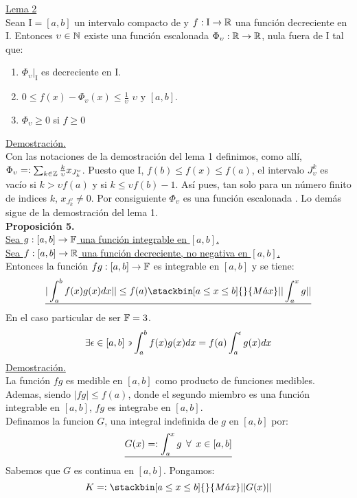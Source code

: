 \underline{Lema 2}\\
Sean $\mathrm{I}=[a,b]$ un intervalo compacto de \R \phantom{} y $f: \mathrm{I} \rightarrow \mathbb{R}$ una función decreciente en $\mathrm{I}$. Entonces \todo \phantom{} $\upsilon \in \mathbb{N}$ existe una función escalonada $\Phi_\upsilon :\mathbb{R} \rightarrow \mathbb{R}$, nula fuera de $\mathrm{I}$ tal que:
\begin{enumerate}[1)]
\item $\Phi_\upsilon |_\mathrm{I}$ es decreciente en $\mathrm{I}$.
\item $0 \leq f(x)-\Phi_\upsilon (x) \leq \frac{1}{\upsilon}$ \todo  \phantom{} $\upsilon$ y \todo \phantom{} \x \en $[a,b]$.
\item $\Phi_\upsilon \geq 0$ si $f \geq 0$
\end{enumerate}

\underline{Demostración.} \\
Con las notaciones de la demostración del lema 1 definimos, como allí,$\Phi_\upsilon=:\sum_{k \in \mathbb{Z}}\frac{k}{\upsilon} x_{J_k^{\upsilon}}$. Puesto que \todo \phantom{} \x \en $\mathrm{I}$, $f(b) \leq f(x) \leq f(a)$, el intervalo $J_\upsilon^k$ es vacío si $k>\upsilon f(a)$ y si $k \leq \upsilon f(b)-1$. Así pues, tan solo para un número finito de indices $k$, $x_{J_k^{\upsilon}} \neq 0$. Por consiguiente $\Phi_\upsilon$ es una función escalonada \R \flecha \R . Lo demás sigue de la demostración del lema 1. \\

\textbf{Proposición 5.}\\
\underline{Sea $g:[a,b] \rightarrow \mathbb{F}$ una función integrable en $[a,b]$.} \\
\underline{Sea $f:[a,b] \rightarrow \mathbb{R}$ una función decreciente, no negativa en $[a,b]$.}\\
Entonces la función $fg:[a,b] \rightarrow \mathbb{F}$ es integrable en $[a,b]$ y se tiene:
\begin{equation*}
\underline{| \int_a^b f(x) g(x) dx| | \leq f(a) \stackbin[a \leq x \leq b]{}{M\acute{a}x} | | \int_a^x g || }
\end{equation*}
En el caso particular de ser $\mathbb{F} =3$.\\
$$
\exists \epsilon \in [a,b] \backepsilon \int_a^b f(x) g(x)dx=f(a) \int_a ^{\epsilon}g(x)dx
$$
\underline{Demostración.}\\
La función $fg$ es medible en $[a,b]$ como producto de funciones medibles. Ademas, siendo $|fg| \leq f(a)$, donde el segundo miembro es una función integrable en $[a,b]$, $fg$ es integrabe en $[a,b]$.\\
Definamos la funcion $G$, una integral indefinida de $g$ en $[a,b]$ por: \\
\begin{equation*}
\underline{G(x)=: \int_a^x g \phantom{s} \forall \phantom{s} x\in [a,b]}
\end{equation*}
Sabemos que $G$ es continua en $[a,b]$. Pongamos:\\
\begin{equation*}
K=:\stackbin[a \leq x \leq b] {}{M\acute{a}x} || G(x) ||
\end{equation*}

